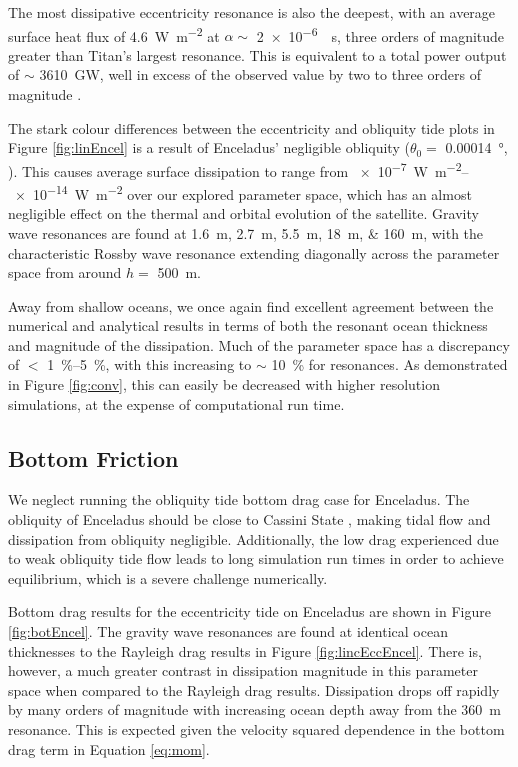 The most dissipative eccentricity resonance is also the deepest, with an average surface heat flux of \SI{4.6}{\watt\per\square\metre} at $\alpha\sim$ \SI{2e-6}{\per\second}, three orders of magnitude greater than Titan's largest resonance. This is equivalent to a total power output of $\sim$ \SI{3610}{\giga\watt}, well in excess of the observed value by two to three orders of magnitude \citep{spencer2006cassini}. 

The stark colour differences between the eccentricity and obliquity tide plots in Figure \ref{fig:linEncel} is a result of Enceladus' negligible obliquity ($\theta_0 =$ \SI{0.00014}{\degree}, \citep{chen2013tidal}). This causes average surface dissipation to range from \SIrange{e-7}{e-14}{\watt\per\square\metre} over our explored parameter space, which has an almost negligible effect on the thermal and orbital evolution of the satellite. Gravity wave resonances are found at \SIlist{1.6;2.7;5.5;18;160}{\metre}, with the characteristic Rossby wave resonance extending diagonally across the parameter space from around $h=$ \SI{500}{\metre}.

Away from shallow oceans, we once again find excellent agreement between the numerical and analytical results in terms of both the resonant ocean thickness and magnitude of the dissipation. Much of the parameter space has a discrepancy of $<$ \SIrange{1}{5}{\percent}, with this increasing to $\sim$ \SI{10}{\percent} for resonances. As demonstrated in Figure \ref{fig:conv}, this can easily be decreased with higher resolution simulations, at the expense of computational run time.


\subsection{Bottom Friction}

We neglect running the obliquity tide bottom drag case for Enceladus. The obliquity of Enceladus should be close to Cassini State \citep{chen2011obliquity}, making tidal flow and dissipation from obliquity negligible. Additionally, the low drag experienced due to weak obliquity tide flow leads to long simulation run times in order to achieve equilibrium, which is a severe challenge numerically.

Bottom drag results for the eccentricity tide on Enceladus are shown in Figure \ref{fig:botEncel}. The gravity wave resonances are found at identical ocean thicknesses to the Rayleigh drag results in Figure \ref{fig:lincEccEncel}. There is, however, a much greater contrast in dissipation magnitude in this parameter space when compared to the Rayleigh drag results. Dissipation drops off rapidly by many orders of magnitude with increasing ocean depth away from the \SI{360}{\metre} resonance. This is expected given the velocity squared dependence in the bottom drag term in Equation \ref{eq:mom}. 

